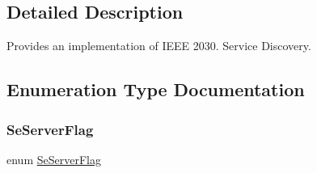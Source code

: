 \subsection{Detailed Description}
Provides an implementation of I\+E\+EE 2030. Service Discovery. 

\subsection{Enumeration Type Documentation}
\mbox{\label{group__se__discover_ga4a1f817f6757fd05bb2b582cd9e1205b}} 
\subsubsection{\texorpdfstring{Se\+Server\+Flag}{SeServerFlag}}
{\footnotesize\ttfamily enum \hyperlink{group__se__discover_ga4a1f817f6757fd05bb2b582cd9e1205b}{Se\+Server\+Flag}}

